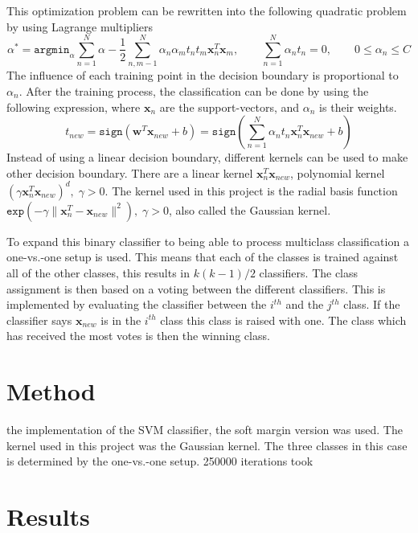 This optimization problem can be rewritten into the following quadratic problem by using Lagrange multipliers
\begin{equation}
\alpha^* = 
\mathtt{argmin}_\alpha \sum_{n=1}^{N}\alpha - \frac{1}{2} 
\sum_{n,m-1}^{N} \alpha_n \alpha_m t_n t_m \mathbf{x}^T_n \mathbf{x}_m, 
\qquad \sum_{n=1}^{N} \alpha_n t_n = 0, \qquad
0\leq \alpha_n \leq C 
\end{equation}
The influence of each training point in the decision boundary is proportional to $ \alpha_n $.
After the training process, the classification can be done by using the following expression, where $ \mathbf{x}_n $  are the support-vectors, and $ \alpha_n $ is their weights.
\begin{equation}
t_{new} = 
\mathtt{sign}(\mathbf{w}^T \mathbf{x}_{new} +b) =
\mathtt{sign}\left( \sum_{n=1}^{N} \alpha_n t_n \mathbf{x}^T_n \mathbf{x}_{new} +b  \right) 
\end{equation} 
Instead of using a linear decision boundary, different kernels can be used to make other decision boundary.
There are a linear kernel $ \mathbf{x}^T_n \mathbf{x}_{new} $, polynomial kernel $ (\gamma \mathbf{x}^T_n \mathbf{x}_{new} )^d,\; \gamma > 0 $.
The kernel used in this project is the radial basis function $ \mathtt{exp}(-\gamma \|\mathbf{x}^T_n - \mathbf{x}_{new} \|^2 ), \; \gamma > 0 $, also called the Gaussian kernel.

To expand this binary classifier to being able to process multiclass classification a one-vs.-one setup is used. 
This means that each of the classes is trained against all of the other classes, this results in $ k(k-1)/2 $ classifiers. 
The class assignment is then based on a voting between the different classifiers. 
This is implemented by evaluating the classifier between the $ i^{th} $ and the $ j^{th} $ class.
If the classifier says $ \mathbf{x}_{new} $ is in the $ i^{th} $ class this class is raised with one.
The class which has received the most votes is then the winning class.
 
\section{Method}
the implementation of the SVM classifier, the soft margin version was used.
The kernel used in this project was the Gaussian kernel.  
The three classes in this case is determined by the one-vs.-one setup. 
250000 iterations took

\section{Results}

